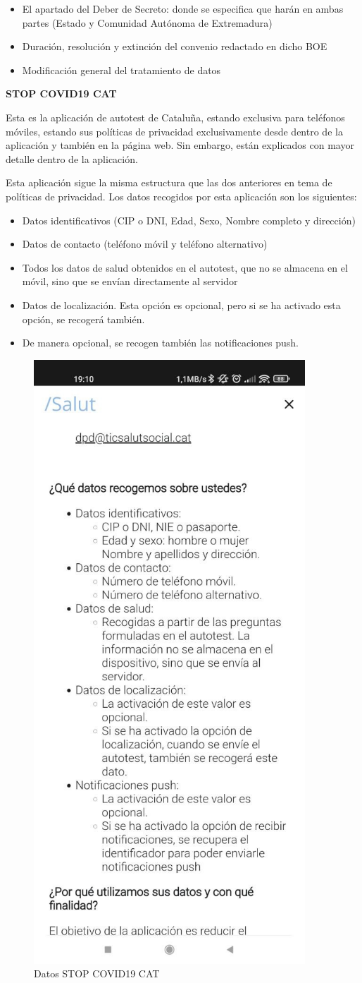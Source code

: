 \documentclass[11pt,a4paper,spanish]{article}
\begin{document}
\begin{itemize}
\item El apartado del Deber de Secreto: donde se especifica que harán en ambas partes (Estado y Comunidad Autónoma de Extremadura)
\item Duración, resolución y extinción del convenio redactado en dicho BOE
\item Modificación general del tratamiento de datos
\end{itemize}

\textbf{STOP COVID19 CAT}

Esta es la aplicación de autotest de Cataluña, estando exclusiva para teléfonos móviles, estando sus políticas de privacidad exclusivamente desde dentro de la aplicación y también en la página web. Sin embargo, están explicados con mayor detalle dentro de la aplicación.

Esta aplicación sigue la misma estructura que las dos anteriores en tema de políticas de privacidad. Los datos recogidos por esta aplicación son los siguientes:

\begin{itemize}
\item Datos identificativos (CIP o DNI, Edad, Sexo, Nombre completo y dirección)
\item Datos de contacto (teléfono móvil y teléfono alternativo)
\item Todos los datos de salud obtenidos en el autotest, que no se almacena en el móvil, sino que se envían directamente al servidor
\item Datos de localización. Esta opción es opcional, pero si se ha activado esta opción, se recogerá también.
\item De manera opcional, se recogen también las notificaciones push.
\end{itemize}

\begin{figure}[h!]
  \centering
  \includegraphics[width=0.35\linewidth]{5.png} 
  \caption{Datos STOP COVID19 CAT}
\end{figure}
\end{document}
